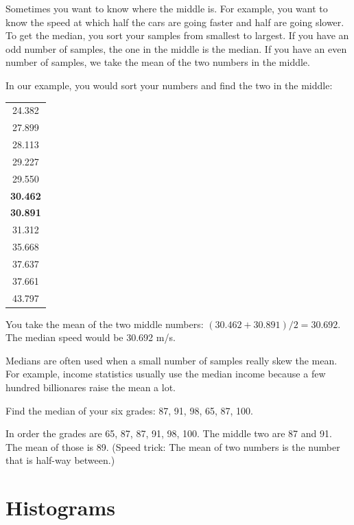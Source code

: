 Sometimes you want to know where the middle is. For example, you want
to know the speed at which half the cars are going faster and half are
going slower. To get the median, you sort your samples from smallest
to largest. If you have an odd number of samples, the one in the
middle is the median.  If you have an even number of samples, we take
the mean of the two numbers in the middle.

In our example, you would sort your numbers and find the two in the middle:

\begin{tabular}{c}
24.382\\
27.899\\
28.113\\
29.227\\
29.550\\
\hline
\textbf{30.462}\\
\textbf{30.891}\\
\hline 
31.312\\
35.668\\
37.637\\
37.661\\
43.797\\
\end{tabular}

You take the mean of the two middle numbers: $(30.462 + 30.891)/2 =
30.692$.  The median speed would be 30.692 m/s.

Medians are often used when a small number of samples really skew the
mean. For example, income statistics usually use the median income
because a few hundred billionares raise the mean a lot.

\begin{Exercise}[title={Median Grade}, label=grades_median]

  Find the median of your six grades: 87, 91, 98, 65, 87, 100.

\end{Exercise}
\begin{Answer}[ref=grades_median]

  In order the grades are 65, 87, 87, 91, 98, 100.  The middle two are 87
  and 91. The mean of those is 89. (Speed trick: The mean of two numbers is the
  number that is half-way between.)
  
 \end{Answer}


\section{Histograms}

